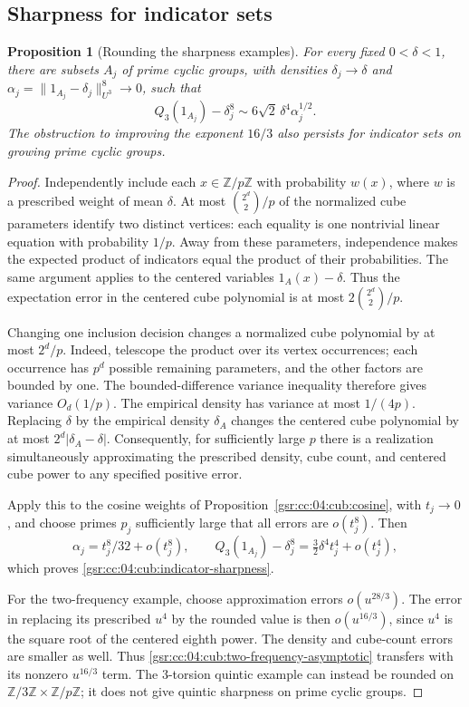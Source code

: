 \documentclass[11pt,letterpaper]{article}
\numberwithin{equation}{section}
\newtheorem{proposition}[theorem]{Proposition}
\theoremstyle{definition}
\theoremstyle{remark}
\newcommand{\1}{\mathbf 1}
\begin{document}
\subsection{Sharpness for indicator sets}

\begin{proposition}[Rounding the sharpness examples]
\label{gsr:cc:04:cub:rounding}
For every fixed $0<\delta<1$, there are subsets $A_j$ of prime cyclic groups,
with densities $\delta_j\to\delta$ and
$\alpha_j=\|1_{A_j}-\delta_j\|_{U^3}^8\to0$, such that
\begin{equation}
 Q_3(1_{A_j})-\delta_j^8
       \sim6\sqrt2\,\delta^4\alpha_j^{1/2}.
 \label{gsr:cc:04:cub:indicator-sharpness}
\end{equation}
The obstruction to improving the exponent $16/3$ also persists for indicator
sets on growing prime cyclic groups.
\end{proposition}

\begin{proof}
Independently include each $x\in\mathbb Z/p\mathbb Z$ with probability
$w(x)$, where $w$ is a prescribed weight of mean $\delta$. At most
$\binom{2^d}{2}/p$ of the normalized cube parameters identify two distinct
vertices: each equality is one nontrivial linear equation with probability
$1/p$. Away from these parameters, independence makes the expected product
of indicators equal the product of their probabilities. The same argument
applies to the centered variables $1_A(x)-\delta$. Thus the expectation
error in the centered cube polynomial is at most
$2\binom{2^d}{2}/p$.

Changing one inclusion decision changes a normalized cube polynomial by at
most $2^d/p$. Indeed, telescope the product over its vertex occurrences;
each occurrence has $p^d$ possible remaining parameters, and the other
factors are bounded by one. The bounded-difference variance inequality
therefore gives variance $O_d(1/p)$. The empirical density has variance at
most $1/(4p)$. Replacing $\delta$ by the empirical density $\delta_A$ changes
the centered cube polynomial by at most $2^d|\delta_A-\delta|$. Consequently,
for sufficiently large $p$ there is a realization simultaneously
approximating the prescribed density, cube count, and centered cube power
to any specified positive error.

Apply this to the cosine weights of Proposition~\ref{gsr:cc:04:cub:cosine}, with
$t_j\to0$, and choose primes $p_j$ sufficiently large that all errors are
$o(t_j^8)$. Then
\[
 \alpha_j=t_j^8/32+o(t_j^8),\qquad
 Q_3(1_{A_j})-\delta_j^8
       =\tfrac32\delta^4t_j^4+o(t_j^4),
\]
which proves \eqref{gsr:cc:04:cub:indicator-sharpness}.

For the two-frequency example, choose approximation errors
$o(u^{28/3})$. The error in replacing its prescribed $u^4$ by the rounded
value is then $o(u^{16/3})$, since $u^4$ is the square root of the centered
eighth power. The density and cube-count errors are smaller as well.
Thus \eqref{gsr:cc:04:cub:two-frequency-asymptotic} transfers with its nonzero
$u^{16/3}$ term. The $3$-torsion quintic example can instead be rounded on
$\mathbb Z/3\mathbb Z\times\mathbb Z/p\mathbb Z$; it does not give
quintic sharpness on prime cyclic groups.
\end{proof}
\end{document}
